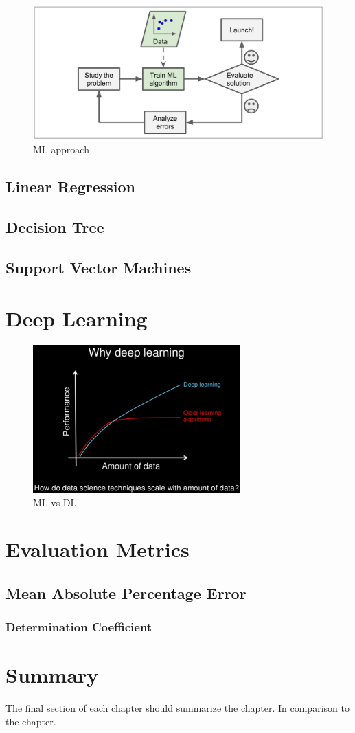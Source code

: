 \begin{figure}[h]
\centering
\includegraphics[width=\linewidth]{figures/Ch2/Ml-Approach.png}
\caption{ML approach \cite{geron2017}}
\label{f:ML-approach}
\end{figure}

\subsection{Linear Regression}
\subsection{Decision Tree}
\subsection{Support Vector Machines}

\section{Deep Learning}
\label{s:Second-Background-Deep-Learning}

\begin{figure}[h]
\centering
\includegraphics[width=8cm]{figures/Ch2/MlvsDL-data-amount.png}
\caption{ML vs DL}
\label{f:ML-vs-DL}
\end{figure}

\section{Evaluation Metrics}
\label{sec:section_Example}
\subsection{Mean Absolute Percentage Error}
\subsubsection{Determination Coefficient}

\section{Summary}
\label{s:Background-Summary}

The final section of each chapter should summarize the chapter. In comparison to the chapter.

